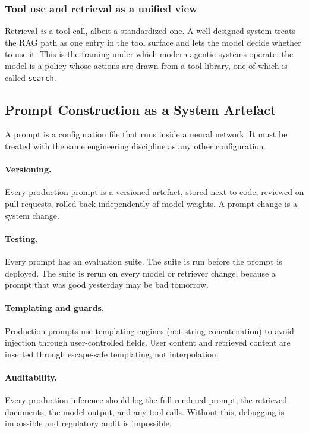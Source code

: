 \subsubsection{Tool use and retrieval as a unified view}

Retrieval \emph{is} a tool call, albeit a standardized one. A
well-designed system treats the RAG path as one entry in the tool
surface and lets the model decide whether to use it. This is the
framing under which modern agentic systems operate: the model is a
policy whose actions are drawn from a tool library, one of which
is called \texttt{search}.

\subsection{Prompt Construction as a System Artefact}

A prompt is a configuration file that runs inside a neural
network. It must be treated with the same engineering discipline
as any other configuration.

\paragraph{Versioning.} Every production prompt is a versioned
artefact, stored next to code, reviewed on pull requests, rolled
back independently of model weights. A prompt change is a system
change.

\paragraph{Testing.} Every prompt has an evaluation suite. The
suite is run before the prompt is deployed. The suite is rerun on
every model or retriever change, because a prompt that was good
yesterday may be bad tomorrow.

\paragraph{Templating and guards.} Production prompts use
templating engines (not string concatenation) to avoid injection
through user-controlled fields. User content and retrieved content
are inserted through escape-safe templating, not interpolation.

\paragraph{Auditability.} Every production inference should log
the full rendered prompt, the retrieved documents, the model
output, and any tool calls. Without this, debugging is impossible
and regulatory audit is impossible.

